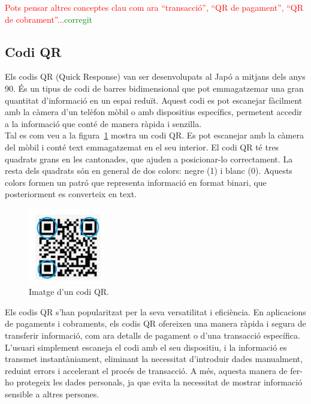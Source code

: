 \documentclass[a4paper,12pt,twoside]{ThesisStyle}
\newcommand{\pau}[1]{\textcolor{red}{#1}}
\newcommand{\sudan}[1]{\textcolor{green}{#1}}
\begin{document}
\pau{Pots pensar altres conceptes clau com ara ``transacció'', ``QR de pagament'', ``QR de cobrament''...}\sudan{corregit}



\subsection{Codi QR}
\label{subsec: Codi QR}

Els codis QR (Quick Response) van ser desenvolupats al Japó a mitjans dels anys 90. És un tipus de codi de barres bidimensional que pot emmagatzemar una gran quantitat d'informació en un espai reduït. Aquest codi es pot escanejar fàcilment amb la càmera d'un telèfon mòbil o amb dispositius específics, permetent accedir a la informació que conté de manera ràpida i senzilla.\\

Tal es com veu a la figura~\ref{fig:Imatge d'un codi QR} mostra un codi QR. Es pot escanejar amb la càmera del mòbil i conté text emmagatzemat en el seu interior. El codi QR té tres quadrats grans en les cantonades, que ajuden a posicionar-lo correctament. La resta dels quadrats són en general de dos colors: negre (1) i blanc (0). Aquests colors formen un patró que representa informació en format binari, que posteriorment es converteix en text.

\begin{figure}[h!] %
    \centering
    \includegraphics[width=0.3\textwidth]{imatges/qr2.png} %
    \caption{Imatge d'un codi QR.} %
    \label{fig:Imatge d'un codi QR} %
  \end{figure}

  Els codis QR s’han popularitzat per la seva versatilitat i eficiència. En aplicacions de pagaments i cobraments, els codis QR ofereixen una manera ràpida i segura de transferir informació, com ara detalls de pagament o d’una transacció específica. L’usuari simplement escaneja el codi amb el seu dispositiu, i la informació es transmet instantàniament, eliminant la necessitat d’introduir dades manualment, reduint errors i accelerant el procés de transacció. A més, aquesta manera de fer-ho protegeix les dades personals, ja que evita la necessitat de mostrar informació sensible a altres persones.
\end{document}
